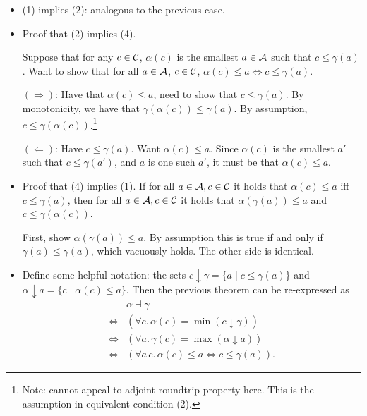 \begin{itemize}
  \item (1) implies (2): analogous to the previous case.

  \item Proof that (2) implies (4).

    Suppose that for any $c \in \mathcal C$, $\alpha(c)$ is the
    smallest $a \in \mathcal A$ such that $c \le \gamma(a)$.
    Want to show that for all $a \in \mathcal A$, $c \in \mathcal C$, 
    $\alpha(c) \le a \iff c \le \gamma(a)$.

    $(\Rightarrow)$: Have that $\alpha(c) \le a$, 
    need to show that $c \le \gamma(a)$.
    By monotonicity, we have that $\gamma(\alpha(c)) \le \gamma(a)$.
    By assumption, $c \le \gamma(\alpha(c))$.\footnote{Note: 
    cannot appeal to adjoint roundtrip property here. This is the assumption 
    in equivalent condition (2).}

    $(\Leftarrow)$: Have $ c \le \gamma(a)$. Want $\alpha(c) \le a$.
    Since \(\alpha(c)\) is the smallest \(a'\)
    such that \(c \le \gamma(a')\),
    and \(a\) is one such \(a'\),
    it must be that
    \(\alpha(c) \le a\).

    \item Proof that (4) implies (1).
    If for all $a \in \mathcal A, c \in \mathcal C$ 
    it holds that $\alpha(c) \le a$ iff $c \le \gamma(a)$, 
    then
    for all $a \in \mathcal A, c \in \mathcal C$ 
    it holds that $\alpha(\gamma(a)) \le a$ and 
    $c \le \gamma(\alpha(c))$.

    First, show $\alpha(\gamma(a)) \le a$.
    By assumption this is true if and only if 
    $\gamma(a) \le \gamma(a)$, which vacuously holds.
    The other side is identical.

\item
    Define some helpful notation: the sets $c \downarrow \gamma = \{a \mid c \le \gamma(a) \}$
    and \(\alpha \downarrow a = \{c \mid \alpha(c) \le a\}\).
    Then the previous theorem can be re-expressed as
    \begin{align*}
    &\alpha\dashv\gamma\\
    \iff &(\forall c.\, \alpha(c) = \min (c \downarrow \gamma))\\
    \iff &(\forall a.\, \gamma(c) = \max (\alpha \downarrow a))\\
    \iff &(\forall a\,c.\, \alpha(c)\le a \iff c\le \gamma(a)).
    \end{align*}
\end{itemize}


